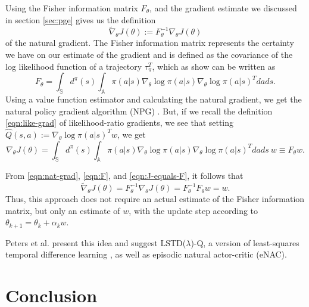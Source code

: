 Using the Fisher information matrix $F_\theta$, and the gradient estimate we discussed in section \ref{sec:pge} gives us the definition
\begin{equation}
  \widetilde{\nabla}_\theta J(\theta) := F^{-1}_\theta \nabla_\theta J(\theta)
  \label{eqn:nat-grad}
\end{equation}
of the natural gradient. 
The Fisher information matrix represents the certainty we have on our estimate of the gradient and is defined as the covariance of the log likelihood function of a trajectory $\tau_{\pi}^T$, which as \cite{4863} show can be written as 
\begin{equation}
  F_\theta = \int_\mathbb{S} d^\pi(s) \int_\mathbb{A} \pi(a|s) \nabla_\theta \log{\pi(a|s)} \nabla_\theta \log{\pi(a|s)}^T dads.
  \label{eqn:F}
\end{equation}
Using a value function estimator and calculating the natural gradient, we get the natural policy gradient algorithm (NPG) \cite{NIPS2017_7233}.
But, if we recall the definition \eqref{eqn:like-grad} of likelihood-ratio gradients, we see that setting $\hat{Q}(s,a) := \nabla_\theta \log \pi(a|s)^T w$, we get
\begin{equation}
  \nabla_\theta J(\theta) = \int_\mathbb{S} {d^\pi(s) \int_\mathbb{A} \pi(a|s) \nabla_\theta \log \pi(a|s) {\nabla_\theta \log \pi(a|s)}^T dads}\ w \equiv F_\theta w.
  \label{eqn:J-equals-F}
\end{equation}

From \eqref{eqn:nat-grad}, \eqref{eqn:F}, and \eqref{eqn:J-equals-F}, it follows that
\begin{equation}
  \widetilde{\nabla}_\theta J(\theta) = F^{-1}_\theta \nabla_\theta J(\theta) = F_\theta^{-1} F_\theta w = w.
\end{equation}
Thus, this approach does not require an actual estimate of the Fisher information matrix, but only an estimate of $w$, with the update step according to $\theta_{k+1} = \theta_k + \alpha_k w$.

Peters et al. \cite{4863} present this idea and suggest LSTD($\lambda$)-Q, a version of least-squares temporal difference learning  \cite{Boyan:1999:LTD:645528.657618}, as well as episodic natural actor-critic (eNAC).

\section{Conclusion}
\label{sec:outro}


